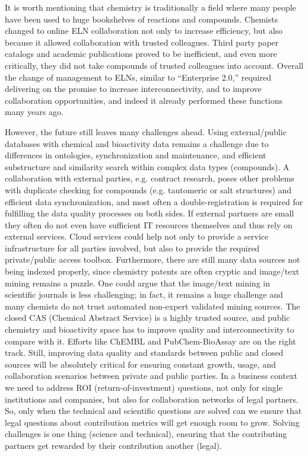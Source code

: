 \documentclass{sig-alternate}
\begin{document}
It is worth mentioning that chemistry is traditionally a field where many people
have been used to huge bookshelves of reactions and compounds. Chemists changed
to online ELN collaboration not only to increase efficiency, but also
because it allowed collaboration with trusted colleagues. Third party paper
catalogs and academic publications proved to be
inefficient, and even more critically, they did not take compounds of trusted
colleagues into account. Overall the change of management to ELNs, similar to
``Enterprise 2.0,'' required delivering on the promise to increase
interconnectivity, and to improve collaboration
opportunities, and indeed it already performed these functions many years ago.

However, the future still leaves many challenges ahead. Using
external/public databases with chemical and bioactivity data remains a
challenge due to differences in ontologies, synchronization and
maintenance, and efficient substructure and similarity search within
complex data types (compounds). A collaboration with external parties,
e.g. contract research, poses other problems with duplicate checking
for compounds (e.g. tautomeric or salt structures) and efficient data
synchronization, and most often a double-registration is required for
fulfilling the data quality processes on both sides. If external
partners are small they often do not even have sufficient IT resources
themselves and thus rely on external services. Cloud services could
help not only to provide a service infrastructure for all parties
involved, but also to provide the required private/public access
toolbox. Furthermore, there are still many data sources not being
indexed properly, since chemistry patents are often cryptic and
image/text mining remains a puzzle. One could argue that the
image/text mining in scientific journals is less challenging; in fact,
it remains a huge challenge and many chemists do not trust automated
non-expert validated mining sources. The closed CAS (Chemical Abstract
Service) is a highly trusted source, and public chemistry and
bioactivity space has to improve quality and interconnectivity to
compare with it. Efforts like ChEMBL and PubChem-BioAssay are on the
right track. Still, improving data quality and standards between
public and closed sources will be absolutely critical for ensuring
constant growth, usage, and collaboration scenarios between private
and public parties.  In a business context we need to address ROI
(return-of-investment) questions, not only for single institutions and
companies, but also for collaboration networks of legal partners.  So,
only when the technical and scientific questions are solved can we
ensure that legal questions about contribution metrics will get enough
room to grow. Solving challenges is one thing (science and technical),
ensuring that the contributing partners get rewarded by their
contribution another (legal).
\end{document}
